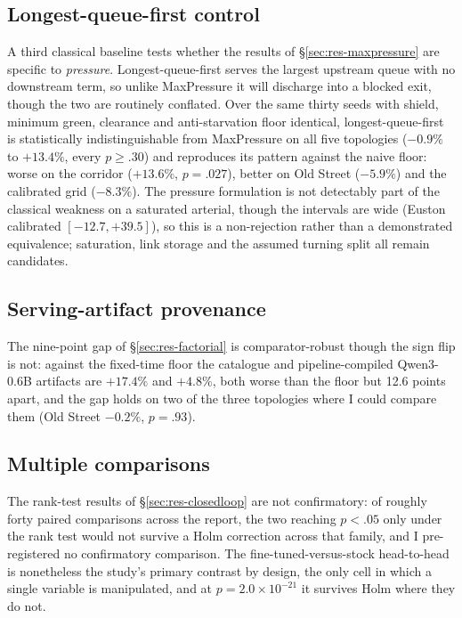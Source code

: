 \subsection{Longest-queue-first control}\label{app:lqf}
A third classical baseline tests whether the results of
\S\ref{sec:res-maxpressure} are specific to \emph{pressure}.
Longest-queue-first serves the largest upstream queue with no downstream
term, so unlike MaxPressure it will discharge into a blocked exit, though
the two are routinely conflated. Over the same thirty seeds with shield,
minimum green, clearance and anti-starvation floor identical,
longest-queue-first is statistically indistinguishable from MaxPressure on
all five topologies ($-0.9\%$ to $+13.4\%$, every $p\ge.30$) and
reproduces its pattern against the naive floor: worse on the corridor
($+13.6\%$, $p{=}.027$), better on Old Street ($-5.9\%$) and the
calibrated grid ($-8.3\%$). The pressure formulation is not detectably
part of the classical weakness on a saturated arterial, though the
intervals are wide (Euston calibrated $[-12.7, +39.5]$), so this is a
non-rejection rather than a demonstrated equivalence; saturation, link
storage and the assumed turning split all remain candidates.

\subsection{Serving-artifact provenance}\label{app:provenance}
The nine-point gap of \S\ref{sec:res-factorial} is comparator-robust
though the sign flip is not: against the fixed-time floor the catalogue
and pipeline-compiled Qwen3-0.6B artifacts are $+17.4\%$ and $+4.8\%$,
both worse than the floor but 12.6 points apart, and the gap holds on two
of the three topologies where I could compare them (Old Street $-0.2\%$,
$p{=}.93$).

\subsection{Multiple comparisons}\label{app:holm}
The rank-test results of \S\ref{sec:res-closedloop} are not confirmatory:
of roughly forty paired comparisons across the report, the two reaching
$p<.05$ only under the rank test would not survive a Holm correction
across that family, and I pre-registered no confirmatory comparison. The
fine-tuned-versus-stock head-to-head is nonetheless the study's primary
contrast by design, the only cell in which a single variable is
manipulated, and at $p{=}2.0{\times}10^{-21}$ it survives Holm where they
do not.

